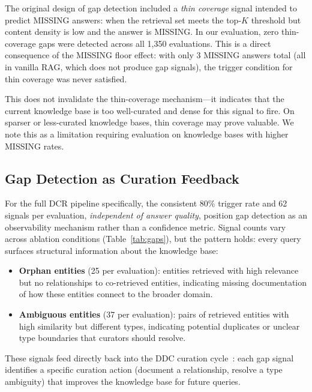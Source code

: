 \documentclass[11pt,a4paper]{article}
\begin{document}
The original design of gap detection included a \emph{thin coverage} signal intended to predict MISSING answers: when the retrieval set meets the top-$K$ threshold but content density is low and the answer is MISSING. In our evaluation, zero thin-coverage gaps were detected across all 1,350 evaluations. This is a direct consequence of the MISSING floor effect: with only 3 MISSING answers total (all in vanilla RAG, which does not produce gap signals), the trigger condition for thin coverage was never satisfied.

This does not invalidate the thin-coverage mechanism---it indicates that the current knowledge base is too well-curated and dense for this signal to fire. On sparser or less-curated knowledge bases, thin coverage may prove valuable. We note this as a limitation requiring evaluation on knowledge bases with higher MISSING rates.

\subsection{Gap Detection as Curation Feedback}

For the full DCR pipeline specifically, the consistent 80\% trigger rate and 62 signals per evaluation, \emph{independent of answer quality}, position gap detection as an observability mechanism rather than a confidence metric. Signal counts vary across ablation conditions (Table~\ref{tab:gaps}), but the pattern holds: every query surfaces structural information about the knowledge base:

\begin{itemize}[nosep]
  \item \textbf{Orphan entities} (25 per evaluation): entities retrieved with high relevance but no relationships to co-retrieved entities, indicating missing documentation of how these entities connect to the broader domain.
  \item \textbf{Ambiguous entities} (37 per evaluation): pairs of retrieved entities with high similarity but different types, indicating potential duplicates or unclear type boundaries that curators should resolve.
\end{itemize}

These signals feed directly back into the DDC curation cycle~\citep{navakoti2026ddc}: each gap signal identifies a specific curation action (document a relationship, resolve a type ambiguity) that improves the knowledge base for future queries.

\end{document}
